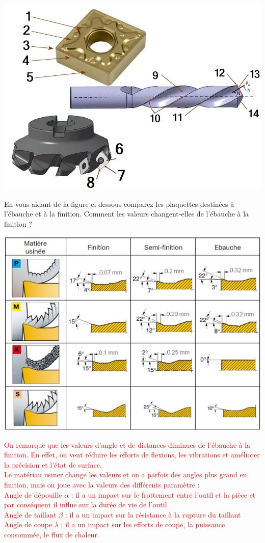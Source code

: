 \documentclass[12pt,a4paper]{article} %
\begin{document}
\includegraphics[scale=0.6]{PLA20.JPG}


\newpage

\begin{exo} En vous aidant de la figure ci-dessous comparez les plaquettes destinées à l'ébauche et à la finition. Comment les valeurs changent-elles de l'ébauche à la finition ?\end{exo}

\includegraphics[scale=0.5]{PLA21.JPG}


\textcolor{red}{On remarque que les valeurs d'angle et de distances diminues de l'ébauche à la finition. En effet, on veut réduire les efforts de flexions, les vibrations et améliorer la précision et l'état de surface.\\
Le matériau usiner change les valeurs et on a parfois des angles plus grand en finition, mais on joue avec la valeurs des différents paramètre :\\
Angle de dépouille $\alpha$ : il a un impact sur le frottement entre l’outil et la pièce et par
conséquent il influe sur la durée de vie de l’outil \\
Angle de taillant $\beta$ : il a un impact sur la résistance à la rupture du taillant \\
Angle de coupe $\lambda$ : il a un impact sur les efforts de coupe, la puissance consommée, le flux de chaleur.}
\end{document}
